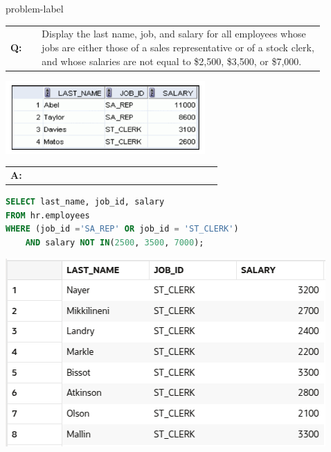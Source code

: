 \begin{problem}{}{problem-label}

\begin{tabular}{@{}l p{0.9\linewidth}@{}}
  \textbf{Q:} & Display the last name, job, and salary for all employees whose jobs are either those of a sales
representative or of a stock clerk, and whose salaries are not equal to \$2,500, \$3,500, or \$7,000.
\end{tabular}

\begin{center}
  \includegraphics[scale=0.8]{images/c2q14.png}
\end{center}

\newpage

\begin{tabular}{@{}l p{0.9\linewidth}@{}}
  \textbf{A:} & 
\end{tabular}

\begin{lstlisting}[language=SQL]
SELECT last_name, job_id, salary
FROM hr.employees
WHERE (job_id ='SA_REP' OR job_id = 'ST_CLERK')
    AND salary NOT IN(2500, 3500, 7000);
\end{lstlisting}

\vspace{1em}

\begin{center}
  \includegraphics[scale=0.8]{images/c2a14.png}
\end{center}

\end{problem}


